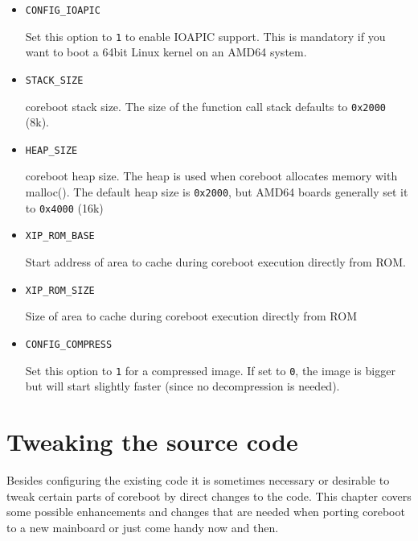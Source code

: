 \documentclass[titlepage,12pt]{article}
\begin{document}
\begin{itemize}
\item \begin{verbatim}CONFIG_IOAPIC\end{verbatim}

Set this option to \texttt{1} to enable IOAPIC support. This is
mandatory if you want to boot a 64bit Linux kernel on an AMD64 system.

\item \begin{verbatim}STACK_SIZE\end{verbatim}

coreboot stack size. The size of the function call stack defaults to
\texttt{0x2000} (8k).

\item \begin{verbatim}HEAP_SIZE\end{verbatim}

coreboot heap size. The heap is used when coreboot allocates memory
with malloc(). The default heap size is \texttt{0x2000}, but AMD64 boards
generally set it to \texttt{0x4000} (16k)

\item \begin{verbatim}XIP_ROM_BASE\end{verbatim}

Start address of area to cache during coreboot execution directly from
ROM.

\item \begin{verbatim}XIP_ROM_SIZE\end{verbatim}

Size of area to cache during coreboot execution directly from ROM

\item \begin{verbatim}CONFIG_COMPRESS\end{verbatim}

Set this option to \texttt{1} for a compressed image. If set to
\texttt{0}, the image is bigger but will start slightly faster (since no
decompression is needed).

\end{itemize}


\newpage

%
% 

\section{Tweaking the source code}
Besides configuring the existing code it is sometimes necessary or
desirable to tweak certain parts of coreboot by direct changes to the
code. This chapter covers some possible enhancements and changes that
are needed when porting coreboot to a new mainboard or just come
handy now and then.
\end{document}
